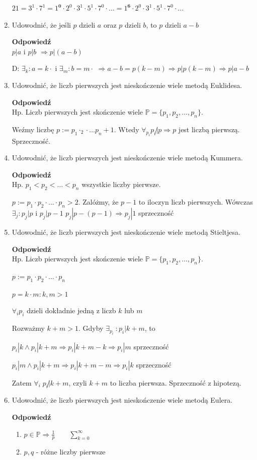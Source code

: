 \documentclass[12pt,a4paper]{article}
\theoremstyle{break}
\newcommand{\Odp}[1]{
		\begin{mdframed}[style=zadanie]
			\textbf{Odpowiedź}\\
			#1
		\end{mdframed}
	}
\begin{document}
\begin{enumerate}[1.]
{		$21=3^1\cdot7^1=1^\textbf{0}\cdot2^0\cdot3^1\cdot5^1\cdot7^0\cdot\dots=1^\textbf{6}\cdot2^0\cdot3^1\cdot5^1\cdot7^0\cdot\dots$
	}
	
	\item Udowodnić, że jeśli $p$ dzieli $a$ oraz $p$ dzieli $b$, to $p$ dzieli $a - b$
	\Odp{
		$p|a$ i $p|b$ $\Rightarrow p|(a-b)$
		
		D: $\exists_k:a=k\cdotp$ i $\exists_m:b=m\cdotp$ $\Rightarrow a-b=p(k-m) \Rightarrow p|p(k-m) \Rightarrow p|a-b$
	}
	
	\item Udowodnić, że liczb pierwszych jest nieskończenie wiele metodą Euklidesa.
	\Odp{
		Hp. Liczb pierwszych jest skończenie wiele $\mathbb{P}=\{p_1,p_2,\dots,p_n\}$.
		
		Weźmy liczbę $p:=p_1\cdotp_2\cdot\dots p_n + 1$. Wtedy $\forall_{p_i} p_i\not| p \Rightarrow p$ jest liczbą pierwszą. Sprzeczność. 
	}
	
	\item Udowodnić, że liczb pierwszych jest nieskończenie wiele metodą Kummera.
	\Odp{
		Hp. $p_1<p_2<\dots<p_n$ wszystkie liczby pierwsze.
		
		$p:=p_1\cdot p_2\cdot\dots\cdot p_n > 2$. Zalóżmy, że $p-1$ to iloczyn liczb pierwszych. Wówczas $\exists_j : p_j|p$ i $p_j|p-1$ $p_j|p-(p-1) \Rightarrow p_j|1$ sprzeczność
	}
	
	\item Udowodnić, że liczb pierwszych jest nieskończenie wiele metodą Stieltjesa.
	\Odp{
		Hp. Liczb pierwszych jest skończenie wiele $\mathbb{P}=\{p_1,p_2,\dots,p_n\}$.
		
		$p:=p_1\cdot p_2\cdot\dots\cdot p_n$
		
		$p=k\cdot m: k,m>1$
		
		$\forall_i p_i$ dzieli dokładnie jedną z liczb $k$ lub $m$
		
		Rozważmy $k+m>1$. Gdyby $\exists_{p_i}\:: p_i|k+m$, to
		
		$p_i|k \wedge p_i|k+m \Rightarrow p_i|k+m-k \Rightarrow p_i|m$ sprzeczność
		
		$p_i|m \wedge p_i|k+m \Rightarrow p_i|k+m-m \Rightarrow p_i|k$ sprzeczność
		
		Zatem $\forall_i \; p_i\not|k+m$, czyli $k+m$ to liczba pierwsza. Sprzeczność z hipotezą.
	}
	
	\item Udowodnić, że liczb pierwszych jest nieskończenie wiele metodą Eulera.
	\Odp{
		\begin{enumerate}[1)]
			\item $p\in\mathbb{P} \Rightarrow \frac{1}{p} \qquad \sum_{k=0}^{\infty}$
			\item $p,q$ - różne liczby pierwsze
			

\end{enumerate}}
\end{enumerate}
\end{document}

